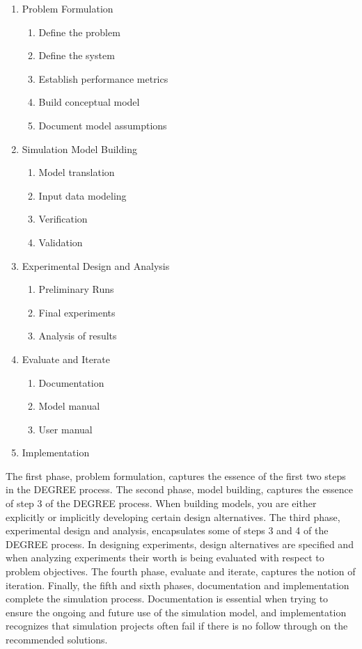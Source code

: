 \documentclass[
]{book}
\theoremstyle{definition}
\theoremstyle{definition}
\theoremstyle{definition}
\theoremstyle{definition}
\theoremstyle{remark}
\begin{document}
\begin{enumerate}
\def\labelenumi{\arabic{enumi}.}
\item
  Problem Formulation

  \begin{enumerate}
  \def\labelenumii{\arabic{enumii}.}
  \item
    Define the problem
  \item
    Define the system
  \item
    Establish performance metrics
  \item
    Build conceptual model
  \item
    Document model assumptions
  \end{enumerate}
\item
  Simulation Model Building

  \begin{enumerate}
  \def\labelenumii{\arabic{enumii}.}
  \item
    Model translation
  \item
    Input data modeling
  \item
    Verification
  \item
    Validation
  \end{enumerate}
\item
  Experimental Design and Analysis

  \begin{enumerate}
  \def\labelenumii{\arabic{enumii}.}
  \item
    Preliminary Runs
  \item
    Final experiments
  \item
    Analysis of results
  \end{enumerate}
\item
  Evaluate and Iterate

  \begin{enumerate}
  \def\labelenumii{\arabic{enumii}.}
  \item
    Documentation
  \item
    Model manual
  \item
    User manual
  \end{enumerate}
\item
  Implementation
\end{enumerate}

The first phase, problem formulation, captures the essence of the first
two steps in the DEGREE process. The second phase, model building,
captures the essence of step 3 of the DEGREE process. When building
models, you are either explicitly or implicitly developing certain
design alternatives. The third phase, experimental design and analysis,
encapsulates some of steps 3 and 4 of the DEGREE process. In designing
experiments, design alternatives are specified and when analyzing
experiments their worth is being evaluated with respect to problem
objectives. The fourth phase, evaluate and iterate, captures the notion
of iteration. Finally, the fifth and sixth phases, documentation and
implementation complete the simulation process. Documentation is
essential when trying to ensure the ongoing and future use of the
simulation model, and implementation recognizes that simulation projects
often fail if there is no follow through on the recommended solutions.
\end{document}
